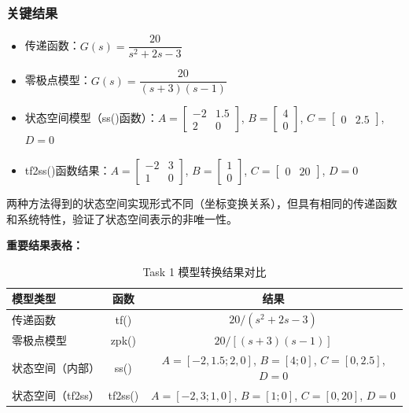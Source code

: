 \documentclass{../common/SCNU_Experimental_Report}
\begin{document}
\subsubsection{关键结果}
\begin{itemize}
    \item 传递函数：$G(s) = \dfrac{20}{s^2 + 2s - 3}$
    \item 零极点模型：$G(s) = \dfrac{20}{(s+3)(s-1)}$
    \item 状态空间模型（ss()函数）：$A = \begin{bmatrix} -2 & 1.5 \\ 2 & 0 \end{bmatrix}$,\; $B = \begin{bmatrix} 4 \\ 0 \end{bmatrix}$,\; $C = \begin{bmatrix} 0 & 2.5 \end{bmatrix}$,\; $D = 0$
    \item tf2ss()函数结果：$A = \begin{bmatrix} -2 & 3 \\ 1 & 0 \end{bmatrix}$,\; $B = \begin{bmatrix} 1 \\ 0 \end{bmatrix}$,\; $C = \begin{bmatrix} 0 & 20 \end{bmatrix}$,\; $D = 0$
\end{itemize}

两种方法得到的状态空间实现形式不同（坐标变换关系），但具有相同的传递函数和系统特性，验证了状态空间表示的非唯一性。

\vspace{1em}
\noindent\textbf{重要结果表格：}
\begin{table}[H]
\centering
\caption{Task 1 模型转换结果对比}
\begin{tabular}{lcc}
\toprule
\textbf{模型类型} & \textbf{函数} & \textbf{结果} \\
\midrule
传递函数 & tf() & $20/(s^2 + 2s - 3)$ \\
零极点模型 & zpk() & $20/[(s+3)(s-1)]$ \\
状态空间（内部） & ss() & $A=[-2,1.5;2,0]$, $B=[4;0]$, $C=[0,2.5]$, $D=0$ \\
状态空间（tf2ss） & tf2ss() & $A=[-2,3;1,0]$, $B=[1;0]$, $C=[0,20]$, $D=0$ \\
\bottomrule
\end{tabular}
\end{table}
\end{document}
